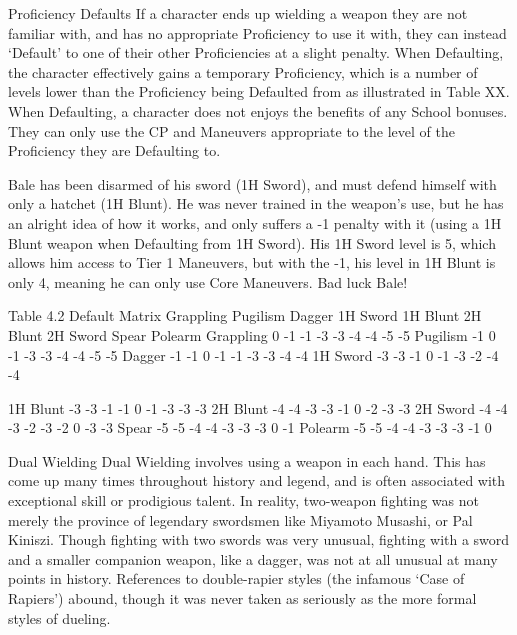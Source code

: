 \documentclass[oneside,11pt,english]{book}
\begin{document}
Proficiency Defaults 
If a character ends up wielding a weapon they are not familiar with, and has no appropriate Proficiency to 
use it with, they can instead ‘Default’ to one of their other Proficiencies at a slight penalty. When 
Defaulting, the character effectively gains a temporary Proficiency, which is a number of levels lower 
than the Proficiency being Defaulted from as illustrated in Table XX. When Defaulting, a character does 
not enjoys the benefits of any School bonuses. They can only use the CP and Maneuvers appropriate to 
the level of the Proficiency they are Defaulting to. 

 

Bale has been disarmed of his sword (1H Sword), and must defend himself with only a hatchet (1H 
Blunt). He was never trained in the weapon’s use, but he has an alright idea of how it works, and only 
suffers a -1 penalty with it (using a 1H Blunt weapon when Defaulting from 1H Sword). His 1H Sword 
level is 5, which allows him access to Tier 1 Maneuvers, but with the -1, his level in 1H Blunt is only 4, 
meaning he can only use Core Maneuvers. Bad luck Bale! 

 
Table 4.2 Default Matrix 
 Grappling Pugilism Dagger 1H Sword 1H Blunt 2H Blunt 2H Sword Spear Polearm 
Grappling 0 -1 -1 -3 -3 -4 -4 -5 -5 
Pugilism -1 0 -1 -3 -3 -4 -4 -5 -5 
Dagger -1 -1 0 -1 -1 -3 -3 -4 -4 
1H Sword -3 -3 -1 0 -1 -3 -2 -4 -4 


1H Blunt -3 -3 -1 -1 0 -1 -3 -3 -3 
2H Blunt -4 -4 -3 -3 -1 0 -2 -3 -3 
2H Sword -4 -4 -3 -2 -3 -2 0 -3 -3 
Spear -5 -5 -4 -4 -3 -3 -3 0 -1 
Polearm -5 -5 -4 -4 -3 -3 -3 -1 0 

 

Dual Wielding 
Dual Wielding involves using a weapon in each hand. This has come up many times throughout history 
and legend, and is often associated with exceptional skill or prodigious talent. In reality, two-weapon 
fighting was not merely the province of legendary swordsmen like Miyamoto Musashi, or Pal Kiniszi. 
Though fighting with two swords was very unusual, fighting with a sword and a smaller companion 
weapon, like a dagger, was not at all unusual at many points in history. References to double-rapier styles 
(the infamous ‘Case of Rapiers’) abound, though it was never taken as seriously as the more formal styles 
of dueling. 

 
\end{document}
